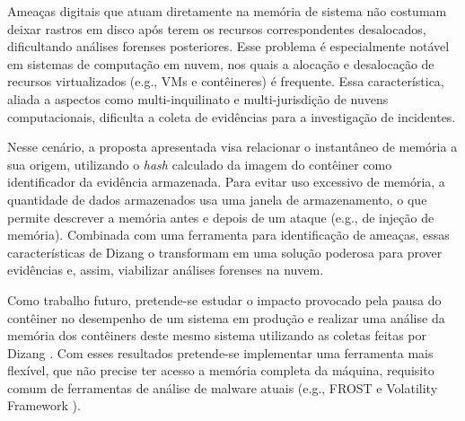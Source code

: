 \documentclass[conference]{IEEEtran}
\newcommand{\marcosT}[1]{{\color{red}{TODO: #1}}}
\newcommand{\fancyname}{Dizang }
\begin{document}
%
Ameaças digitais que atuam diretamente na memória de sistema não costumam deixar rastros em disco após terem os recursos correspondentes desalocados, dificultando análises forenses posteriores.
%
Esse problema é especialmente notável em sistemas de computação em nuvem, nos quais a alocação e desalocação de recursos virtualizados (e.g., VMs e contêineres) é frequente.
%
Essa característica, aliada a aspectos como multi-inquilinato e multi-jurisdição de nuvens computacionais, dificulta a coleta de evidências para a investigação de incidentes.


Nesse cenário, a proposta apresentada visa relacionar o instantâneo de memória a sua origem, utilizando o \textit{hash} calculado da imagem do contêiner como identificador da evidência armazenada.
%
Para evitar uso excessivo de memória, a quantidade de dados armazenados usa uma janela de armazenamento, o que permite descrever a memória antes e depois de um ataque (e.g., de injeção de memória). 
%
Combinada com uma ferramenta para identificação de ameaças, essas características de \fancyname o transformam em uma solução poderosa para prover evidências e, assim, viabilizar análises forenses na nuvem.
%
%
%

Como trabalho futuro, pretende-se estudar o impacto provocado pela pausa do contêiner no desempenho de um sistema em produção e realizar uma análise da memória dos contêiners deste mesmo sistema utilizando as coletas feitas por \fancyname. 
%
Com esses resultados pretende-se implementar uma ferramenta mais flexível, que não precise ter acesso a memória completa da máquina, requisito comum de ferramentas de análise de malware atuais (e.g., FROST \cite{Dykstra_FROST:2013} e Volatility Framework \cite{VolatilityFoundation2014}).
\end{document}
